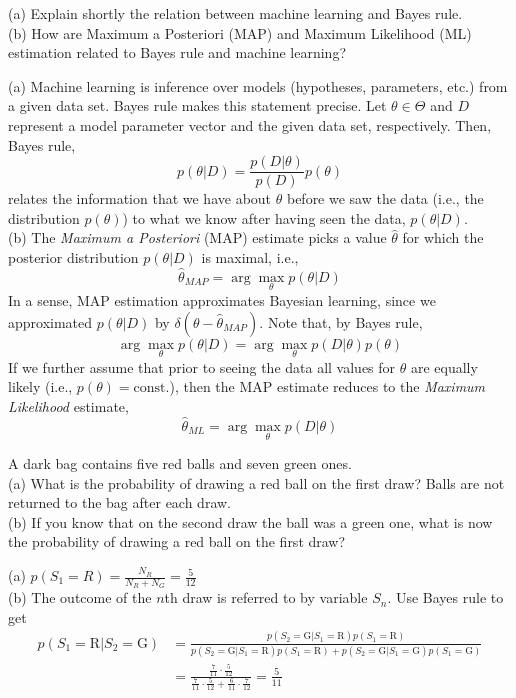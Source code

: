\documentclass[a4paper]{article}
\begin{document}
\begin{ExerciseList}
\Exercise[label={ex:ml-map}] (a) Explain shortly the relation between machine learning and Bayes rule.\\
(b) How are Maximum a Posteriori (MAP) and Maximum Likelihood (ML) estimation related to Bayes rule and machine learning?

\Answer[ref={ex:ml-map}] (a) Machine learning is inference over models (hypotheses, parameters, etc.) from a given data set. Bayes rule makes this statement precise. Let $\theta \in \Theta$ and $D$ represent a model parameter vector and the given data set, respectively. Then, Bayes rule,
$$
p(\theta|D) = \frac{p(D|\theta)}{p(D)} p(\theta)
$$
relates the information that we have about $\theta$ before we saw the data (i.e., the distribution $p(\theta)$) to what we know after having seen the data, $p(\theta|D)$. \\
(b) The \emph{Maximum a Posteriori} (MAP) estimate picks a value $\hat\theta$ for which the posterior distribution $p(\theta|D)$ is maximal, i.e.,
$$ \hat\theta_{MAP} = \arg\max_\theta p(\theta|D)$$
In a sense, MAP estimation approximates Bayesian learning, since we approximated $p(\theta|D)$ by $\delta(\theta-\hat\theta_{MAP})$. Note that, by Bayes rule, $$\arg\max_\theta p(\theta|D) = \arg\max_\theta p(D|\theta)p(\theta)$$
If we further assume that prior to seeing the data all values for $\theta$ are equally likely (i.e., $p(\theta)=\text{const.}$), then the MAP estimate reduces to the \emph{Maximum Likelihood} estimate,
$$ \hat\theta_{ML} = \arg\max_\theta p(D|\theta)$$

 \Exercise[label={ex:causality}] A dark bag contains five red balls and seven green ones. \\(a) What is the probability of drawing a red ball on the first draw? Balls are not returned to the bag after each draw. \\(b) If you know that on the second draw the ball was a green one, what is now the probability of drawing a red ball on the first draw?

\Answer[ref={ex:causality}]
(a) $p(S_1=R) = \frac{N_R}{N_R+N_G}= \frac{5}{12}$ \\
(b) The outcome of the $n$th draw is referred to by variable $S_n$. Use Bayes rule to get 
\begin{align*}
p(S_1=\text{R}|S_2=\text{G}) &=\frac{p(S_2=\text{G}|S_1=\text{R})p(S_1=\text{R})}{p(S_2=\text{G}|S_1=\text{R})p(S_1=\text{R})+p(S_2=\text{G}|S_1=\text{G})p(S_1=\text{G})}\\
&= \frac{\frac{7}{11}\cdot\frac{5}{12}}{\frac{7}{11}\cdot\frac{5}{12}+\frac{6}{11}\cdot\frac{7}{12}} = \frac{5}{11}
\end{align*}



\end{ExerciseList}
\end{document}
